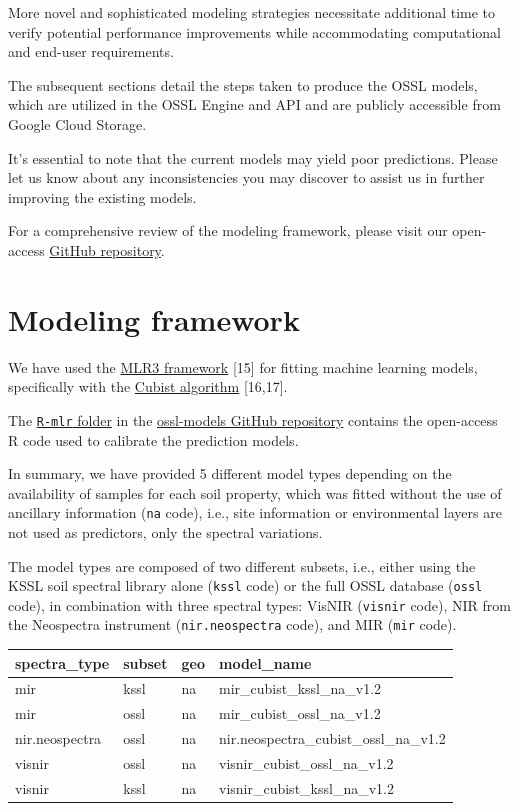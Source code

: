 \documentclass[
  letterpaper,
  DIV=11,
  numbers=noendperiod]{scrreprt}
\begin{document}
More novel and sophisticated modeling strategies necessitate additional
time to verify potential performance improvements while accommodating
computational and end-user requirements.

The subsequent sections detail the steps taken to produce the OSSL
models, which are utilized in the OSSL Engine and API and are publicly
accessible from Google Cloud Storage.

It's essential to note that the current models may yield poor
predictions. Please let us know about any inconsistencies you may
discover to assist us in further improving the existing models.

For a comprehensive review of the modeling framework, please visit our
open-access
\href{https://github.com/soilspectroscopy/ossl-models}{GitHub
repository}.

\section{Modeling framework}\label{modeling-framework}

We have used the \href{https://mlr3book.mlr-org.com/}{MLR3 framework}
{[}15{]} for fitting machine learning models, specifically with the
\href{https://cran.r-project.org/web/packages/Cubist/vignettes/cubist.html}{Cubist
algorithm} {[}16,17{]}.

The
\href{https://github.com/soilspectroscopy/ossl-models/tree/main/R-mlr}{\texttt{R-mlr}
folder} in the
\href{https://github.com/soilspectroscopy/ossl-models}{ossl-models
GitHub repository} contains the open-access R code used to calibrate the
prediction models.

In summary, we have provided 5 different model types depending on the
availability of samples for each soil property, which was fitted without
the use of ancillary information (\texttt{na} code), i.e., site
information or environmental layers are not used as predictors, only the
spectral variations.

The model types are composed of two different subsets, i.e., either
using the KSSL soil spectral library alone (\texttt{kssl} code) or the
full OSSL database (\texttt{ossl} code), in combination with three
spectral types: VisNIR (\texttt{visnir} code), NIR from the Neospectra
instrument (\texttt{nir.neospectra} code), and MIR (\texttt{mir} code).

\begin{longtable}[]{@{}llll@{}}
\toprule\noalign{}
spectra\_type & subset & geo & model\_name \\
\midrule\noalign{}
\endhead
\bottomrule\noalign{}
\endlastfoot
mir & kssl & na & mir\_cubist\_kssl\_na\_v1.2 \\
mir & ossl & na & mir\_cubist\_ossl\_na\_v1.2 \\
nir.neospectra & ossl & na & nir.neospectra\_cubist\_ossl\_na\_v1.2 \\
visnir & ossl & na & visnir\_cubist\_ossl\_na\_v1.2 \\
visnir & kssl & na & visnir\_cubist\_kssl\_na\_v1.2 \\
\end{longtable}
\end{document}

